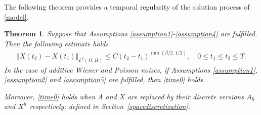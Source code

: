 \documentclass[review,12pt]{elsarticle}
\newtheorem{theorem}{Theorem}[section]
\newcommand{\secref}[1]{{Section~\ref{#1}}}
\begin{document}
The following theorem provides a temporal regularity of the solution process of \eqref{model}. 
\begin{theorem}
\label{timeregular}
Suppose that Assumptions \ref{assumption1}-\ref{assumption4} are fulfilled. Then the following estimate holds
\begin{eqnarray}
\label{time0}
\Vert X(t_2)-X(t_1)\Vert_{L^2(\Omega, H)}\leq C(t_2-t_1)^{\min(\beta/2, 1/2)},\quad 0\leq t_1\leq t_2\leq T.
\end{eqnarray}
In the case of additive Wiener  and Poisson noises, if Assumptions \ref{assumption1}, \ref{assumption2} and \ref{assumption5} are fulfilled, then \eqref{time0} holds.

Moreover, \eqref{time0}  holds when $A$ and $X$ are replaced by their discrete versions $A_h$ and $X^h$ respectively; defined in \secref{spacediscretization}.
\end{theorem}
\end{document}
